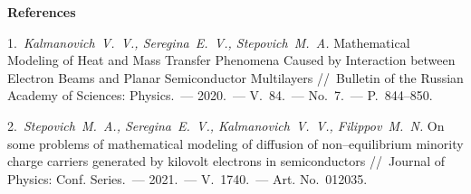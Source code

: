 \bigskip
\centerline{\bf References}
\medskip

1.~{\it Kalmanovich~V.~V., Seregina~E.~V., Stepovich~M.~A.} Mathematical Modeling of Heat and Mass Transfer Phenomena Caused by Interaction between Electron Beams and Planar Semiconductor Multilayers //~Bulletin of the Russian Academy of Sciences: Physics.~--- 2020.~--- V.~84.~--- No.~7.~--- P.~844--850.

2.~{\it Stepovich~M.~A., Seregina~E.~V., Kalmanovich~V.~V., Filippov~M.~N.} On some problems of mathematical modeling of diffusion of non--equilibrium minority charge carriers generated by kilovolt electrons in semiconductors //~Journal of Physics: Conf. Series.~--- 2021.~--- V.~1740.~--- Art. No.~012035.
